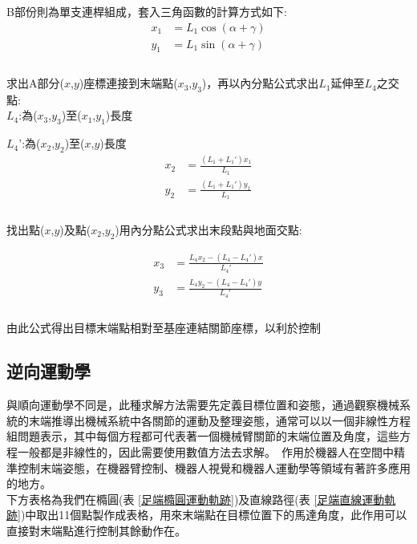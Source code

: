 B部份則為單支連桿組成，套入三角函數的計算方式如下:\\

\[
\begin{aligned}
x_{1}&=L_{1}\cos \left( \alpha +\gamma \right)\\
y_{1}&=L_{1}\sin \left( \alpha +\gamma \right)\\
\end{aligned}
\]\\

求出A部分($x$,$y$)座標連接到末端點($x_3$,$y_3$)，再以內分點公式求出$L_1$延伸至$L_4$之交點:\\

$L_4$:為($x_3$,$y_3$)至($x_1$,$y_1$)長度\

$L_4$':為($x_2$,$y_2$)至($x$,$y$)長度\\

\[
\begin{aligned}
x_{2}&= \frac{\left (L_{1} + L_{1}' \right) x_{1}}{L_{1}}\\
y_{2}&= \frac{\left (L_{1} + L_{1}' \right) y_{1}}{L_{1}}\\
\end{aligned}
\]\\

找出點($x$,$y$)及點($x_2$,$y_2$)用內分點公式求出末段點與地面交點:

\[
\begin{aligned}
x_{3}&= \frac{L_{4} x_{2} - \left (L_{4} - L_{4}' \right) x}{L_{4}'}\\
y_{3}&= \frac{L_{4} y_{2} - \left (L_{4} - L_{4}' \right) y}{L_{4}'}\\
\end{aligned}
\]\\

由此公式得出目標末端點相對至基座連結關節座標，以利於控制\\

\subsection{逆向運動學}
與順向運動學不同是，此種求解方法需要先定義目標位置和姿態，通過觀察機械系統的末端推導出機械系統中各關節的運動及整理姿態，通常可以以一個非線性方程組問題表示，其中每個方程都可代表著一個機械臂關節的末端位置及角度，這些方程一般都是非線性的，因此需要使用數值方法去求解。\
作用於機器人在空間中精準控制末端姿態，在機器臂控制、機器人視覺和機器人運動學等領域有著許多應用的地方。\\

下方表格為我們在橢圓(表 \ref{足端橢圓運動軌跡})及直線路徑(表 \ref{足端直線運動軌跡})中取出11個點製作成表格，用來末端點在目標位置下的馬達角度，此作用可以直接對末端點進行控制其餘動作在。

